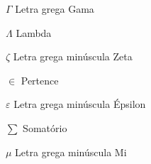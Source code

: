 \begin{simbolos}
  \item[$ \Gamma $] Letra grega Gama
  \item[$ \Lambda $] Lambda
  \item[$ \zeta $] Letra grega minúscula Zeta
  \item[$ \in $] Pertence
  \item[$ \varepsilon $] Letra grega minúscula Épsilon
  \item[$ \sum $] Somatório
  \item[$ \mu $] Letra grega minúscula Mi
\end{simbolos}
